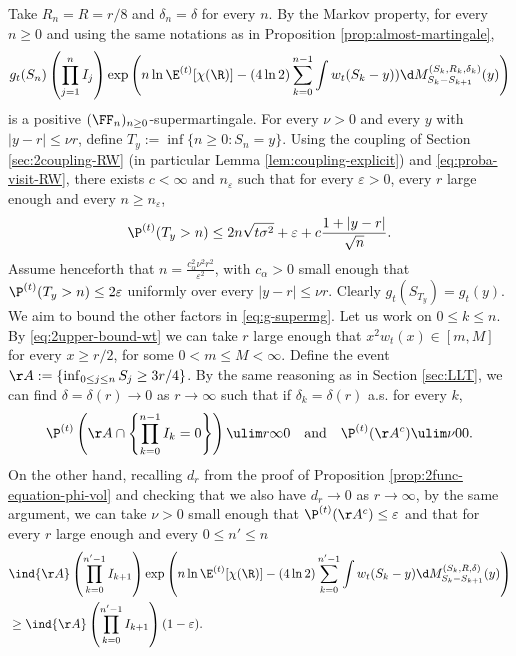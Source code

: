 \documentclass[10pt,a4paper]{article}
\begin{document}
Take $R_n = R = r/8$ and $\delta_n = \delta$ for every $n$. 
By the Markov property, for every $n\geq 0$ and using the same notations as in Proposition \ref{prop:almost-martingale}, 
\begin{align}\label{eq:2g-supermg-vol}
g_t(S_n) \left(\prod_{j=1}^{n} I_j\right) \exp\left( n\ln\E^{(t)}[\chi(\R)] - (4\ln 2) \sum_{k=0}^{n-1} \int w_t(S_k-y)) \d M_{S_k-S_{k+1}}^{(S_k, R_k, \delta_k)}(y) \right)
\end{align}
is a positive $(\FF_n)_{n\geq 0}$-supermartingale. For every $\nu>0$ and every $y$ with $|y-r|\leq \nu r$, define $T_y := \inf\{n \geq 0 : S_n = y\}$. 
Using the coupling of Section \ref{sec:2coupling-RW} (in particular Lemma \ref{lem:coupling-explicit}) and \eqref{eq:proba-visit-RW}, there exists $c<\infty$ and $n_\varepsilon$ %
such that for every $\varepsilon>0$, every $r$ large enough and every $n\geq n_\varepsilon$, 
\[ \P^{(t)}(T_y > n) \leq 2n\sqrt{t\sigma^2} + \varepsilon + c\frac{1+|y-r|}{\sqrt{n}} . \]
Assume henceforth that %
$n = \frac{c_\alpha^2 \nu^2 r^2}{\varepsilon^2}$, with $c_\alpha>0$ small enough that $\P^{(t)}(T_y > n) \leq 2\varepsilon$ uniformly over every $|y-r|\leq \nu r$. 
Clearly $g_t(S_{T_y}) = g_t(y)$. We aim to bound the other factors in \eqref{eq:g-supermg}. Let us work on $0\leq k \leq n$. By \eqref{eq:2upper-bound-wt} we can take $r$ large enough that $x^2 w_t(x) \in [m, M]$ for every $x\geq r/2$, for some $0<m\leq M<\infty$. 
Define the event $\AA := \{ \inf_{0\leq j \leq n} S_j \geq 3r/4 \}$. By the same reasoning as in Section \ref{sec:LLT}, we can find $\delta = \delta(r) \to 0$ as $r\to\infty$ such that if $\delta_k = \delta(r)$ a.s. for every $k$, 
\[ \P^{(t)}\left(\AA \cap \left\{\prod_{k=0}^{n-1} I_k = 0 \right\}\right) \ulim r \infty 0 \quad \text{and} \quad \P^{(t)}(\AA^c) \ulim \nu 0 0 . \]
On the other hand, recalling $d_r$ from the proof of Proposition \ref{prop:2func-equation-phi-vol} and checking that we also have $d_r \to 0$ as $r\to\infty$, by the same argument, we can take $\nu>0$ small enough that $\P^{(t)}(\AA^c)\leq \varepsilon$ and that for every $r$ large enough and every $0\leq n' \leq n$ 
\begin{align*}
&\ind{\AA} \left(\prod_{k=0}^{n'-1} I_{k+1}\right) \exp\left(n\ln\E^{(t)}[\chi(\R)] - (4\ln 2) \sum_{k=0}^{n'-1} \int w_t(S_k-y) \d M_{S_k-S_{k+1}}^{(S_k, R, \delta)}(y) \right) \\
&\geq \ind{\AA}\left(\prod_{k=0}^{n'-1} I_{k+1} \right) (1-\varepsilon) . 
\end{align*}
\end{document}
